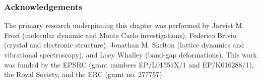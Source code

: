 
\subsubsection{Acknowledgements}

The primary research underpinning this chapter was performed by Jarvist M. Frost (molecular dynamic and Monte Carlo investigations), Federico Brivio (crystal and electronic structure), Jonathan M. Skelton (lattice dynamics and vibrational spectroscopy), and Lucy Whalley (band-gap deformations).
This work was funded by the EPSRC (grant numbers EP/L01551X/1 and EP/K016288/1), the Royal Society, and the ERC (grant no. 277757). 
